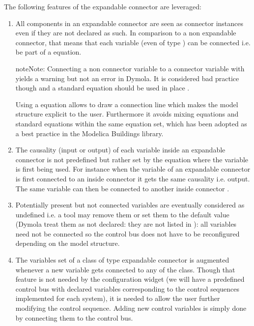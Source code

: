 \documentclass[letterpaper,10pt, openany,english]{sphinxmanual}
\begin{document}
The following features of the expandable connector are leveraged:
\begin{enumerate}
%
\item {} 
All components in an expandable connector are seen as connector instances even if they are not declared as such. In comparison to a non expandable connector, that means that each variable (even of type ) can be connected i.e. be part of a  equation.

\begin{sphinxadmonition}{note}{Note:}
Connecting a non connector variable to a connector variable with  yields a warning but not an error in Dymola. It is considered bad practice though and a standard equation should be used in place .

Using a  equation allows to draw a connection line which makes the model structure explicit to the user. Furthermore it avoids mixing  equations and standard equations within the same equation set, which has been adopted as a best practice in the Modelica Buildings library.
\end{sphinxadmonition}

\item {} 
The causality (input or output) of each variable inside an expandable connector is not predefined but rather set by the  equation where the variable is first being used. For instance when the variable of an expandable connector is first connected to an inside connector  it gets the same causality i.e. output. The same variable can then be connected to another inside connector  .

\item {} 
Potentially present but not connected variables are eventually considered as undefined i.e. a tool may remove them or set them to the default value (Dymola treat them as not declared: they are not listed in ): all variables need not be connected so the control bus does not have to be reconfigured depending on the model structure.

\item {} 
The variables set of a class of type expandable connector is augmented whenever a new variable gets connected to any  of the class. Though that feature is not needed by the configuration widget (we will have a predefined control bus with declared variables corresponding to the control sequences implemented for each system), it is needed to allow the user further modifying the control sequence. Adding new control variables is simply done by connecting them to the control bus.

\end{enumerate}
\end{document}
